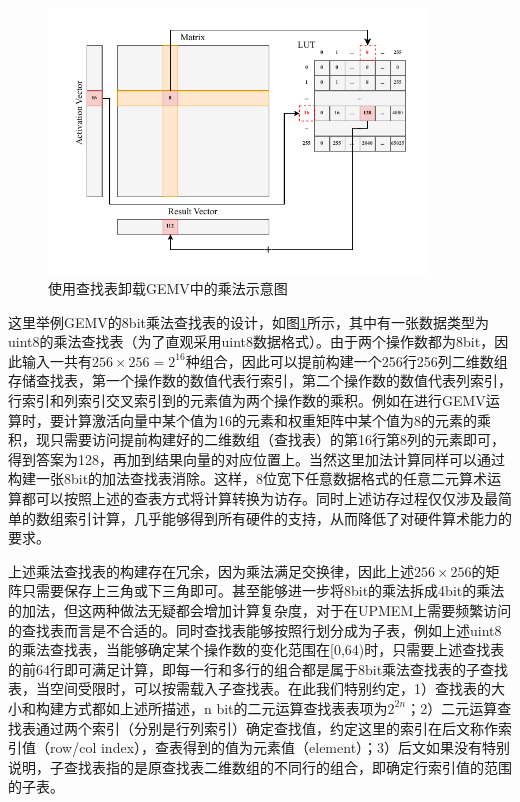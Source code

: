 \begin{figure}[!htbp]
	\centering
    \includegraphics[width=0.9\textwidth]{figures/LUT.pdf}
	\caption{使用查找表卸载GEMV中的乘法示意图}
    \label{LUT}
\end{figure}

这里举例GEMV的8bit乘法查找表的设计，如图\ref{LUT}所示，其中有一张数据类型为uint8的乘法查找表（为了直观采用uint8数据格式）。由于两个操作数都为8bit，因此输入一共有$256\times 256=2^{16}$种组合，因此可以提前构建一个256行256列二维数组存储查找表，第一个操作数的数值代表行索引，第二个操作数的数值代表列索引，行索引和列索引交叉索引到的元素值为两个操作数的乘积。例如在进行GEMV运算时，要计算激活向量中某个值为16的元素和权重矩阵中某个值为8的元素的乘积，现只需要访问提前构建好的二维数组（查找表）的第16行第8列的元素即可，得到答案为128，再加到结果向量的对应位置上。当然这里加法计算同样可以通过构建一张8bit的加法查找表消除。这样，8位宽下任意数据格式的任意二元算术运算都可以按照上述的查表方式将计算转换为访存。同时上述访存过程仅仅涉及最简单的数组索引计算，几乎能够得到所有硬件的支持，从而降低了对硬件算术能力的要求。

上述乘法查找表的构建存在冗余，因为乘法满足交换律，因此上述$256\times 256$的矩阵只需要保存上三角或下三角即可。甚至能够进一步将8bit的乘法拆成4bit的乘法的加法，但这两种做法无疑都会增加计算复杂度，对于在UPMEM上需要频繁访问的查找表而言是不合适的。同时查找表能够按照行划分成为子表，例如上述uint8的乘法查找表，当能够确定某个操作数的变化范围在[0,64)时，只需要上述查找表的前64行即可满足计算，即每一行和多行的组合都是属于8bit乘法查找表的子查找表，当空间受限时，可以按需载入子查找表。在此我们特别约定，1）查找表的大小和构建方式都如上述所描述，n bit的二元运算查找表表项为$2^{2n}$；2）二元运算查找表通过两个索引（分别是行列索引）确定查找值，约定这里的索引在后文称作索引值（row/col index），查表得到的值为元素值（element）；3）后文如果没有特别说明，子查找表指的是原查找表二维数组的不同行的组合，即确定行索引值的范围的子表。

